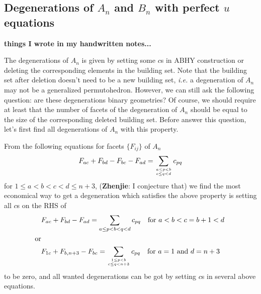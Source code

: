 \documentclass[hidelinks,12pt]{article}
\begin{document}
\subsection{Degenerations of $A_n$ and $B_n$ with perfect $u$ equations} 

{\bf things I wrote in my handwritten notes...}

The degenerations of $A_n$ is given by setting some $c$s in ABHY construction or deleting the corresponding elements in the building set. Note that the building set after deletion doesn't need to be a new building set, \emph{i.e.} a degeneration of $A_n$ may not be a generalized permutohedron. However, we can still ask the following question: are these degenerations binary geometries? 
Of course, we should require at least that the number of facets of the degeneration of $A_n$ should be equal to the size of the corresponding deleted building set.
Before answer this question, let's first find all degenerations of $A_n$ with this property.


From the following equations for facets $\{F_{ij}\}$ of $A_n$
\[
F_{ac}+F_{bd}-F_{bc}-F_{ad}=\sum_{a\leq p<b\atop{c\leq q<d}}c_{pq}
\]
for $1\leq a<b<c<d\leq n+3$, ({\bf Zhenjie}: I conjecture that) we find the most economical way to get a degeneration which satisfies the above property is setting all $c$s on the RHS of 
\begin{align*}
    &F_{ac}+F_{bd}-F_{ad}=\sum_{a\leq p<b< q<d}c_{pq}\quad \text{for $a<b<c=b+1<d$ }\\
    \text{or}&\\
    &F_{1c}+F_{b,n+3}-F_{bc}=\sum_{1\leq p<b\atop{c\leq q<n+3}}c_{pq}\quad \text{for $a=1$ and $d=n+3$}
\end{align*}
to be zero, and all wanted degenerations can be got by setting $c$s in several above equations. 
\end{document}
